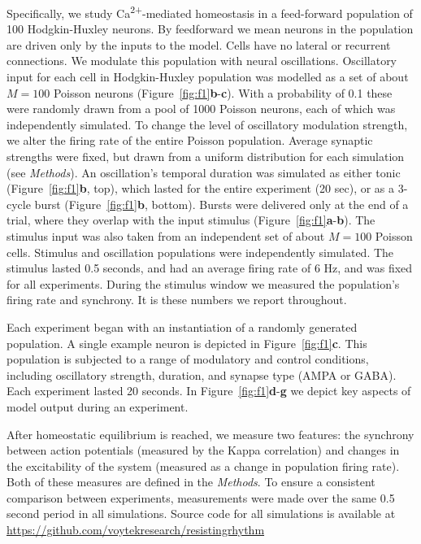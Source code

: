 \documentclass{article}
\begin{document}
Specifically, we study Ca\textsuperscript{2+}-mediated homeostasis in a feed-forward population of 100 Hodgkin-Huxley neurons. By feedforward we mean neurons in the population are driven only by the inputs to the model. Cells have no lateral or recurrent connections. We modulate this population with neural oscillations. Oscillatory input for each cell in Hodgkin-Huxley population was modelled as a set of about $M=100$ Poisson neurons (Figure~\ref{fig:f1}\textbf{b}-\textbf{c}). With a probability of 0.1 these were randomly drawn from a pool of 1000 Poisson neurons, each of which was independently simulated. To change the level of oscillatory modulation strength, we alter the firing rate of the entire Poisson population. Average synaptic strengths were fixed, but drawn from a uniform distribution for each simulation (see \textit{Methods}). An oscillation's temporal duration was simulated as either tonic (Figure~\ref{fig:f1}\textbf{b}, top), which lasted for the entire experiment (20 sec), or as a 3-cycle burst (Figure~\ref{fig:f1}\textbf{b}, bottom). Bursts were delivered only at the end of a trial, where they overlap with the input stimulus (Figure~\ref{fig:f1}\textbf{a}-\textbf{b}). The stimulus input was also taken from an independent set of about $M=100$ Poisson cells. Stimulus and oscillation populations were independently simulated. The stimulus lasted 0.5 seconds, and had an average firing rate of 6 Hz, and was fixed for all experiments. During the stimulus window we measured the population's firing rate and synchrony. It is these numbers we report throughout.

Each experiment began with an instantiation of a randomly generated population. A single example neuron is depicted in Figure~\ref{fig:f1}\textbf{c}. This population is subjected to a range of modulatory and control conditions, including oscillatory strength, duration, and synapse type (AMPA or GABA). Each experiment lasted 20 seconds. In Figure~\ref{fig:f1}\textbf{d}-\textbf{g} we depict key aspects of model output during an experiment. 

After homeostatic equilibrium is reached, we measure two features: the synchrony between action potentials (measured by the Kappa correlation) and changes in the excitability of the system (measured as a change in population firing rate). Both of these measures are defined in the \textit{Methods}. To ensure a consistent comparison between experiments, measurements were made over the same 0.5 second period in all simulations. Source code for all simulations is available at \url{https://github.com/voytekresearch/resistingrhythm}
\end{document}
